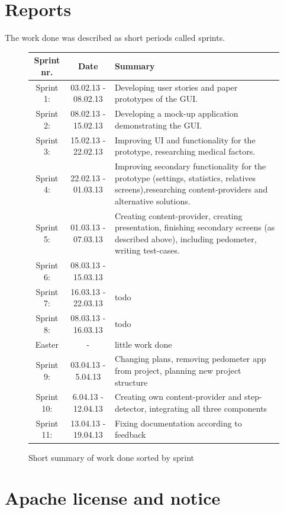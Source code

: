 \section{Reports}
The work done was described as short periods called sprints. 
\begin{figure}
\caption{Short summary of work done sorted by sprint}
\begin{tabular}{|c|c|p{7cm}|}
\hline
Sprint nr. & Date & Summary\\
\hline
Sprint 1: & 03.02.13 - 08.02.13 & Developing user stories and paper prototypes of the GUI.\\ 
\hline
Sprint 2: & 08.02.13 - 15.02.13 & Developing a mock-up application demonstrating the GUI.\\
\hline
Sprint 3: & 15.02.13 - 22.02.13 & Improving UI and functionality for the prototype, researching medical factors. \\
\hline
Sprint 4: & 22.02.13 - 01.03.13 & Improving secondary functionality for the prototype (settings, statistics, relatives screens),researching content-providers and alternative solutions. \\
\hline
Sprint 5: & 01.03.13 - 07.03.13 & Creating content-provider, creating presentation, finishing secondary screens (as described above), including pedometer, writing test-cases.\\
\hline
Sprint 6: & 08.03.13 - 15.03.13 &\\%
\hline
Sprint 7: & 16.03.13 - 22.03.13 &todo\\%
\hline
Sprint 8: & 08.03.13 - 16.03.13 &todo\\%
\hline
Easter &-&little work done\\
\hline
Sprint 9: & 03.04.13 - 5.04.13 & Changing plans, removing pedometer app from project, planning new project structure\\%
\hline
Sprint 10: & 6.04.13 - 12.04.13 & Creating own content-provider and step-detector, integrating all three components\\
\hline
Sprint 11: & 13.04.13 - 19.04.13 & Fixing documentation according to feedback\\
\hline 
\end{tabular} 
\label{tab:sprintList}
\end{figure}
\newpage

\section{Apache license and notice}
\label{appendix:license}

